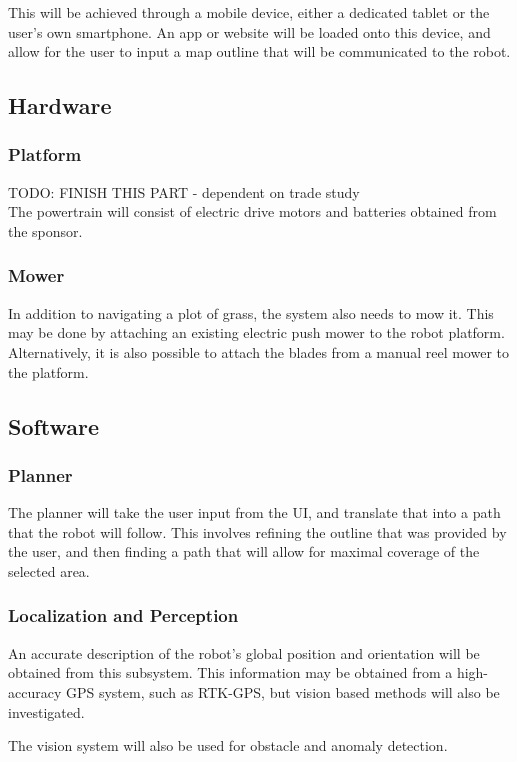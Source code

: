 \documentclass{article}
\begin{document}
	This will be achieved through a mobile device, either a dedicated tablet or the user's own smartphone. An app or website will be loaded onto this device, and allow for the user to input a map outline that will be communicated to the robot. 
	
	\subsection{Hardware}
		\subsubsection{Platform}
		TODO: FINISH THIS PART - dependent on trade study \\ 
			The powertrain will consist of electric drive motors and batteries obtained from the sponsor. 
			
		\subsubsection{Mower}
			In addition to navigating a plot of grass, the system also needs to mow it. This may be done by attaching an existing electric push mower to the robot platform. Alternatively, it is also possible to attach the blades from a manual reel mower to the platform. 
	
	\subsection{Software}
		\subsubsection{Planner}
			The planner will take the user input from the UI, and translate that into a path that the robot will follow. This involves refining the outline that was provided by the user, and then finding a path that will allow for maximal coverage of the selected area. 
			
		\subsubsection{Localization and Perception}
			An accurate description of the robot's global position and orientation will be obtained from this subsystem. This information may be obtained from a high-accuracy GPS system, such as RTK-GPS, but vision based methods will also be investigated. 
			
			The vision system will also be used for obstacle and anomaly detection. 
		
\end{document}
